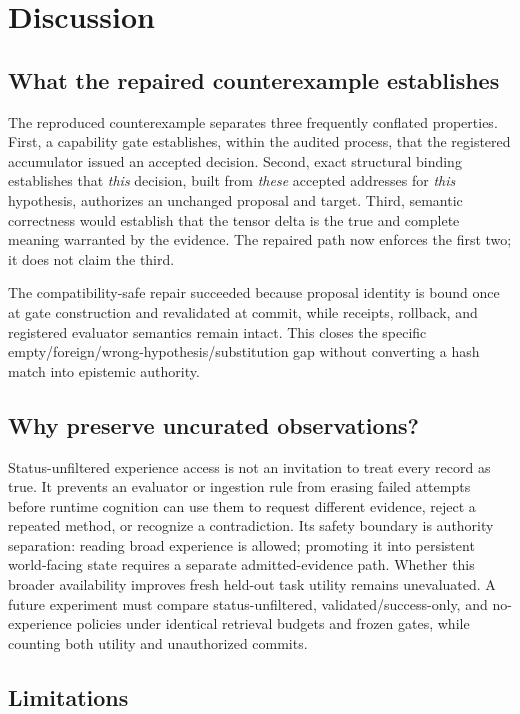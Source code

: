 \documentclass[10pt]{article}
\begin{document}
\section{Discussion}

\subsection{What the repaired counterexample establishes}

The reproduced counterexample separates three frequently conflated properties. First, a capability gate establishes, within the audited process, that the registered accumulator issued an accepted decision. Second, exact structural binding establishes that \emph{this} decision, built from \emph{these} accepted addresses for \emph{this} hypothesis, authorizes an unchanged proposal and target. Third, semantic correctness would establish that the tensor delta is the true and complete meaning warranted by the evidence. The repaired path now enforces the first two; it does not claim the third.

The compatibility-safe repair succeeded because proposal identity is bound once at gate construction and revalidated at commit, while receipts, rollback, and registered evaluator semantics remain intact. This closes the specific empty/foreign/wrong-hypothesis/substitution gap without converting a hash match into epistemic authority.

\subsection{Why preserve uncurated observations?}

Status-unfiltered experience access is not an invitation to treat every record as true. It prevents an evaluator or ingestion rule from erasing failed attempts before runtime cognition can use them to request different evidence, reject a repeated method, or recognize a contradiction. Its safety boundary is authority separation: reading broad experience is allowed; promoting it into persistent world-facing state requires a separate admitted-evidence path. Whether this broader availability improves fresh held-out task utility remains unevaluated. A future experiment must compare status-unfiltered, validated/success-only, and no-experience policies under identical retrieval budgets and frozen gates, while counting both utility and unauthorized commits.

\subsection{Limitations}
\end{document}
